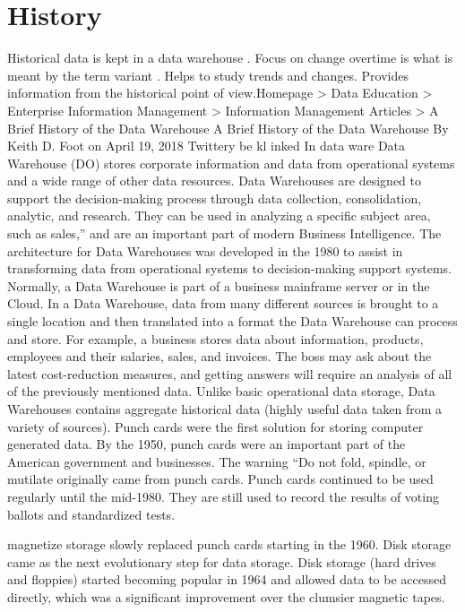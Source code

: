 \documentclass{article}
\begin{document}
 \section{ History}
 Historical data is kept in a data warehouse . Focus on change overtime is what is meant by the term variant . Helps to study trends and changes. Provides information from the historical point of view.Homepage > Data Education > Enterprise Information Management > Information Management Articles > A Brief History of the Data Warehouse
A Brief History of the Data Warehouse
By Keith D. Foot on April 19, 2018
Twittery be kl inked In
data ware  Data Warehouse (DO) stores corporate information and data from operational systems and a wide range of other data resources. Data Warehouses are designed to support the decision-making process through data collection, consolidation, analytic, and research. They can be used in analyzing a specific subject area, such as sales,” and are an important part of modern Business Intelligence. The architecture for Data Warehouses was developed in the 1980 to assist in transforming data from operational systems to decision-making support systems. Normally, a Data Warehouse is part of a business mainframe server or in the Cloud.
In a Data Warehouse, data from many different sources is brought to a single location and then translated into a format the Data Warehouse can process and store. For example, a business stores data about  information, products, employees and their salaries, sales, and invoices. The boss may ask about the latest cost-reduction measures, and getting answers will require an analysis of all of the previously mentioned data. Unlike basic operational data storage, Data Warehouses contains aggregate historical data (highly useful data taken from a variety of sources).
Punch cards were the first solution for storing computer generated data. By the 1950, punch cards were an important part of the American government and businesses. The warning “Do not fold, spindle, or mutilate originally came from punch cards. Punch cards continued to be used regularly until the mid-1980. They are still used to record the results of voting ballots and standardized tests.

magnetize storage slowly replaced punch cards starting in the 1960. Disk storage came as the next evolutionary step for data storage. Disk storage (hard drives and floppies) started becoming popular in 1964 and allowed data to be accessed directly, which was a significant improvement over the clumsier magnetic tapes.
\end{document}
